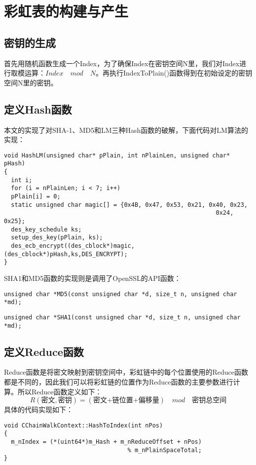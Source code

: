 \section{彩虹表的构建与产生}
\subsection{密钥的生成}
首先用随机函数生成一个Index，为了确保Index在密钥空间N里，我们对Index进行取模运算：$Index\quad mod \quad N$。再执行IndexToPlain()函数得到在初始设定的密钥空间N里的密钥。
\subsection{定义Hash函数}
本文的实现了对SHA-1、MD5和LM三种Hash函数的破解，下面代码对LM算法的实现：
\begin{lstlisting}
void HashLM(unsigned char* pPlain, int nPlainLen, unsigned char* pHash)
{   
  int i; 
  for (i = nPlainLen; i < 7; i++)
  pPlain[i] = 0;
  static unsigned char magic[] = {0x4B, 0x47, 0x53, 0x21, 0x40, 0x23, 
                                                            0x24, 0x25};
  des_key_schedule ks;
  setup_des_key(pPlain, ks);
  des_ecb_encrypt((des_cblock*)magic,(des_cblock*)pHash,ks,DES_ENCRYPT);
}
\end{lstlisting}
SHA1和MD5函数的实现则是调用了OpenSSL的API函数：
\begin{lstlisting}
unsigned char *MD5(const unsigned char *d, size_t n, unsigned char *md);
\end{lstlisting}
\begin{lstlisting}
unsigned char *SHA1(const unsigned char *d, size_t n, unsigned char *md);
\end{lstlisting}
\subsection{定义Reduce函数}
Reduce函数是将密文映射到密钥空间中，彩虹链中的每个位置使用的Reduce函数都是不同的，因此我们可以将彩虹链的位置作为Reduce函数的主要参数进行计算。所以Reduce函数定义如下：
\begin{equation}
R(\text{密文},\text{密钥})=(\text{密文+链位置+偏移量})\quad mod \quad \text{密钥总空间}
\end{equation}
具体的代码实现如下：
\begin{lstlisting}
void CChainWalkContext::HashToIndex(int nPos)
{
  m_nIndex = (*(uint64*)m_Hash + m_nReduceOffset + nPos)
                                   % m_nPlainSpaceTotal;
}

\end{lstlisting}
